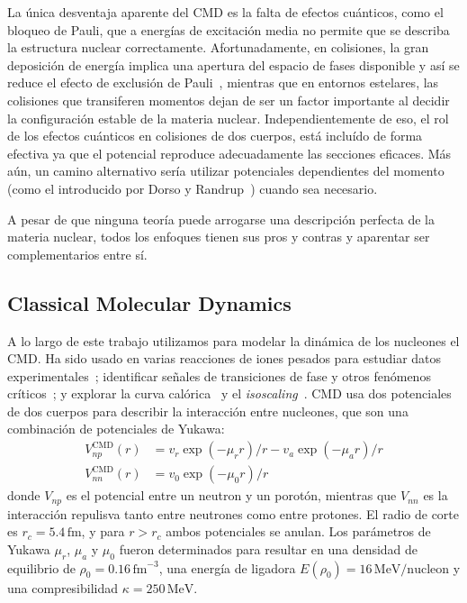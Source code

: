 La única desventaja aparente del CMD es la falta de efectos cuánticos, como el bloqueo de Pauli, que a energías de excitación media no permite que se describa la estructura nuclear correctamente.
Afortunadamente, en colisiones, la gran deposición de energía implica una apertura del espacio de fases disponible y así se reduce el efecto de exclusión de Pauli~\cite{lopez_lectures_2000}, mientras que en entornos estelares, las colisiones que transiferen momentos dejan de ser un factor importante al decidir la configuración estable de la materia nuclear.
Independientemente de eso, el rol de los efectos cuánticos en colisiones de dos cuerpos, está incluído de forma efectiva ya que el potencial reproduce adecuadamente las secciones eficaces.
Más aún, un camino alternativo sería utilizar potenciales dependientes del momento (como el introducido por Dorso y Randrup~\cite{dorso_classical_1988}) cuando sea necesario.

A pesar de que ninguna teoría puede arrogarse una descripción perfecta de la materia nuclear, todos los enfoques tienen sus pros y contras y aparentar ser complementarios entre sí.

\subsection{Classical Molecular Dynamics}\label{ssc:cmd}
A lo largo de este trabajo utilizamos para modelar la dinámica de los nucleones el CMD.\@
Ha sido usado en varias reacciones de iones pesados para estudiar datos experimentales~\cite{chernomoretz_quasiclassical_2002}; identificar señales de transiciones de fase y otros fenómenos críticos~\cite{lopez_lectures_2000, barranon_searching_2001, dorso_selection_2001, barranon_critical_2003, barranon_time_2007}; y explorar la curva calórica~\cite{barranon_entropy_2004} y el \emph{isoscaling}~\cite{dorso_dynamical_2006, dorso_isoscaling_2011}.
CMD usa dos potenciales de dos cuerpos para describir la interacción entre nucleones, que son una combinación de potenciales de Yukawa:
\begin{align*}
  V^{\text{CMD}}_{np}(r) &=v_{r}\exp(-\mu_{r}r)/{r}-v_{a}\exp(-\mu_{a}r)/{r}\\
  V^{\text{CMD}}_{nn}(r) &=v_{0}\exp(-\mu_{0}r)/{r}
\end{align*}
donde $V_{np}$ es el potencial entre un neutron y un porotón, mientras que $V_{nn}$ es la interacción repulisva tanto entre neutrones como entre protones.
El radio de corte es $r_c=5.4\,\text{fm}$, y para $r>r_c$ ambos potenciales se anulan.
Los parámetros de Yukawa $\mu_r$, $\mu_a$ y $\mu_0$ fueron determinados para resultar en una densidad de equilibrio de $\rho_0=0.16\,\text{fm}^{-3}$, una energía de ligadora $E(\rho_0)=16\,\text{MeV/nucleon}$ y una compresibilidad $\kappa=250\,\text{MeV}$.

